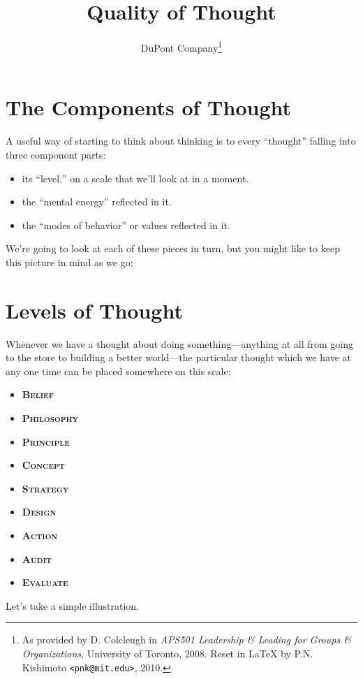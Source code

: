 \documentclass[a5paper]{article}
\title{Quality of Thought}
\author{DuPont Company\footnote{As provided by D. Colcleugh in \emph{APS501 Leadership \& Leading for Groups \& Organizations}, University of Toronto, 2008. Reset in LaTeX by P.N. Kishimoto \texttt{<pnk@mit.edu>}, 2010.}}
\date{}
\begin{document}
\maketitle
\thispagestyle{empty}

\section*{The Components of Thought}
A useful way of starting to think about thinking is to every ``thought'' falling into three componont parts:
\begin{itemize}
  \item its ``level,'' on a scale that we'll look at in a moment.
  \item the ``mental energy'' reflected in it.
  \item the ``modes of behavior'' or values reflected in it.
\end{itemize}
We're going to look at each of these pieces in turn, but you might like to keep this picture in mind as we go:

\begin{figure}[h]
\centering
{}
\end{figure}

\section{Levels of Thought}
Whenever we have a thought about doing something---anything at all from going to the store to building a better world---the particular thought which we have at any one time can be placed somewhere on this scale:
\begin{itemize} \setlength{\itemsep}{0pt}\setlength{\parskip}{0pt}
  \item \textbf{\scshape Belief}
  \item \textbf{\scshape Philosophy}
  \item \textbf{\scshape Principle}
  \item \textbf{\scshape Concept}
  \item \textbf{\scshape Strategy}
  \item \textbf{\scshape Design}
  \item \textbf{\scshape Action}
  \item \textbf{\scshape Audit}
  \item \textbf{\scshape Evaluate}
\end{itemize}
Let's take a simple illustration.
\end{document}

